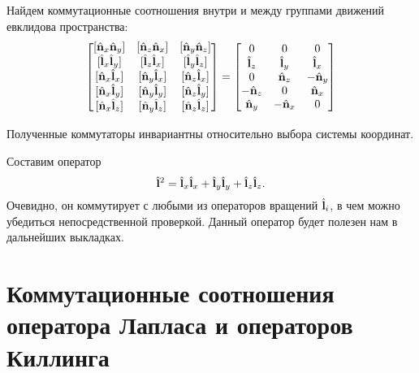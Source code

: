 \documentclass[12pt,a4paper]{article}
\begin{document}
        Найдем коммутационные соотношения внутри и между группами движений евклидова пространства:
        \begin{equation}
            \begin{bmatrix}
                [ \Op{n}_x \Op{n}_y ] & [ \Op{n}_z \Op{n}_x ] & [ \Op{n}_y \Op{n}_z ] \\
                [ \Op{l}_x \Op{l}_y ] & [ \Op{l}_z \Op{l}_x ] & [ \Op{l}_y \Op{l}_z ] \\
                [ \Op{n}_x \Op{l}_x ] & [ \Op{n}_y \Op{l}_x ] & [ \Op{n}_z \Op{l}_x ] \\
                [ \Op{n}_x \Op{l}_y ] & [ \Op{n}_y \Op{l}_y ] & [ \Op{n}_z \Op{l}_y ] \\
                [ \Op{n}_x \Op{l}_z ] & [ \Op{n}_y \Op{l}_z ] & [ \Op{n}_z \Op{l}_z ]
            \end{bmatrix}
            =
            \begin{bmatrix}
                0          &   0        &   0        \\
                  \Op{l}_z &   \Op{l}_y &   \Op{l}_x \\
                0          &   \Op{n}_z & - \Op{n}_y \\
                - \Op{n}_z &   0        &   \Op{n}_x \\
                  \Op{n}_y & - \Op{n}_x &   0
            \end{bmatrix}
        \end{equation}

        Полученные коммутаторы инвариантны относительно выбора системы координат.

        Составим оператор
        \begin{equation}
            \hat{\mathbf{l}}^2 = \hat{\mathbf{l}}_x \hat{\mathbf{l}}_x + \hat{\mathbf{l}}_y \hat{\mathbf{l}}_y + \hat{\mathbf{l}}_z \hat{\mathbf{l}}_z .
        \end{equation}
        Очевидно, он коммутирует с любыми из операторов вращений $\hat{\mathbf{l}}_i$, в чем можно убедиться непосредственной проверкой. Данный оператор будет полезен нам в дальнейших выкладках.


    \section{Коммутационные соотношения оператора Лапласа и операторов Киллинга}
\end{document}
